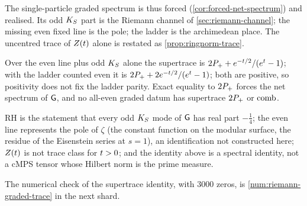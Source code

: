 The single-particle graded spectrum is thus forced (\cref{cor:forced-net-spectrum}) and
realised. Its odd $K_S$ part is the Riemann channel of \cref{sec:riemann-channel}; the
missing even fixed line is the pole; the ladder is the archimedean place. The
uncentred trace of $Z(t)$ alone is restated as \cref{prop:ringnorm-trace}.

\begin{proposition}
\label{prop:ladder-parity-free}
Over the even line plus odd $K_S$ alone the supertrace is $2P_{+} + e^{-t/2}/(e^t-1)$;
with the ladder counted even it is $2P_{+} + 2e^{-t/2}/(e^t-1)$; both are positive,
so positivity does not fix the ladder parity. Exact equality to $2P_{+}$ forces the net
spectrum of $\mathsf G$, and no all-even graded datum has supertrace $2P_{+}$ or $\operatorname{comb}$.
\end{proposition}

\begin{observation}
\label{obs:phantasm-scope}
RH is the statement that every odd $K_S$ mode of $\mathsf G$ has real part $-\tfrac14$; the
even line represents the pole of $\zeta$ (the constant function on the modular surface,
the residue of the Eisenstein series at $s=1$), an identification not constructed here;
$Z(t)$ is not trace class for $t>0$; and the identity above is a spectral identity, not
a cMPS tensor whose Hilbert norm is the prime measure.
\end{observation}

The numerical check of the supertrace identity, with $3000$ zeros, is
\cref{num:riemann-graded-trace} in the next shard.
